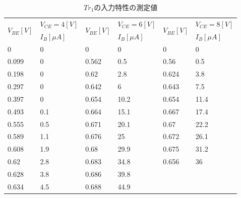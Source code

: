 \documentclass[10pt, a4j, dvipdfmx]{jarticle}
\begin{document}
    \begin{table}[H]
        \centering
        \caption{$Tr_1$の入力特性の測定値}
        \label{tbl:1}
        \small
        \begin{tabular}{|l|l||l|l||l|l|}
        \hline
        \multirow{2}{*}{$V_{BE}[V]$} & $V_{CE}=4[V]$ & \multirow{2}{*}{$V_{BE}[V]$} & $V_{CE}=6[V]$ & \multirow{2}{*}{$V_{BE}[V]$} & $V_{CE}=8[V]$ \\ \cline{2-2} \cline{4-4} \cline{6-6} 
                                & $I_B[\mu A]$   &                         & $I_B[\mu A]$   &                         & $I_B[\mu A]$   \\ \hline
        0                       & 0        & 0                       & 0        & 0                       & 0        \\ \hline
        0.099                   & 0        & 0.562                   & 0.5      & 0.56                    & 0.5      \\ \hline
        0.198                   & 0        & 0.62                    & 2.8      & 0.624                   & 3.8      \\ \hline
        0.297                   & 0        & 0.642                   & 6        & 0.643                   & 7.5      \\ \hline
        0.397                   & 0        & 0.654                   & 10.2     & 0.654                   & 11.4     \\ \hline
        0.493                   & 0.1      & 0.664                   & 15.1     & 0.667                   & 17.4     \\ \hline
        0.555                   & 0.5      & 0.671                   & 20.1     & 0.67                    & 22.2     \\ \hline
        0.589                   & 1.1      & 0.676                   & 25       & 0.672                   & 26.1     \\ \hline
        0.608                   & 1.9      & 0.68                    & 29.9     & 0.675                   & 31.2     \\ \hline
        0.62                    & 2.8      & 0.683                   & 34.8     & 0.656                   & 36       \\ \hline
        0.628                   & 3.8      & 0.686                   & 39.8     &                        &         \\ \hline
        0.634                   & 4.5      & 0.688                   & 44.9     &                        &         \\ \hline

\end{tabular}
\end{table}
\end{document}
